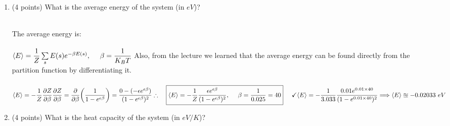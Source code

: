 \documentclass[fleqn]{article}
\begin{document}
\begin{enumerate}
\begin{enumerate}
        \item (4 points) What is the average energy of the system (in $eV$)?

          \textcolor{hwColor}{
            \\
            The average energy is:
            \\
            \\
            $
              \langle E \rangle=\dfrac{1}{Z} \sum\limits_{s} E(s) e^{-\beta E(s)}, ~~~~ \beta=\dfrac{1}{K_B T}
              \\
              \\
            $
            Also, from the lecture we learned that the average energy can be found directly from the partition function
            by differentiating it.
            \\
            \\
            $
              \langle E \rangle=-\dfrac{1}{Z} \dfrac{\partial Z}{\partial \beta}
              \\
              \\
              \\
              \dfrac{\partial Z}{\partial \beta}
              =\dfrac{\partial}{\partial \beta} \bigg( \dfrac{1}{1-e^{\epsilon \beta}} \bigg)
              =\dfrac{0-(-\epsilon e^{\epsilon \beta})}{(1-e^{\epsilon \beta})^2}
              \\
              \\
              \\
              \therefore ~~~ \boxed{
                \langle E \rangle=-\dfrac{1}{Z} \dfrac{\epsilon e^{\epsilon \beta}}{(1-e^{\epsilon \beta})^2}, ~~~~ \beta=\dfrac{1}{0.025}=40
              } ~~~~ \checkmark
              \\
              \\
              \\
              \langle E \rangle=-\dfrac{1}{3.033} \dfrac{0.01 e^{ 0.01 \times 40 }}{(1-e^{0.01 \times 40})^2}
              \\
              \\
              \\
              \Longrightarrow \langle E \rangle \approxeq -0.02033 ~ eV
              \\
            $
          }

        \item (4 points) What is the heat capacity of the system (in $eV/K$)?


\end{enumerate}
\end{enumerate}
\end{document}
